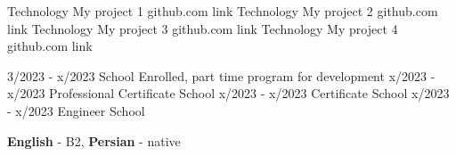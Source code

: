 \documentclass[9pt]{developercv} %
\begin{document}
    \begin{entrylist}
        \entry
        {Technology}
        {My project 1}
        {github.com link}
        {%
            \lipsum[1][1-3]}
        \entry
        {Technology}
        {My project 2}
        {github.com link}
        {%
            \lipsum[1][1-3]}
        \entry
        {Technology}
        {My project 3}
        {github.com link}
        {%
            \lipsum[1][1-3]}
        \entry
        {Technology}
        {My project 4}
        {github.com link}
        {%
            \lipsum[1][1-3]}
    \end{entrylist}

    \vspace{-10 pt}
    \begin{entrylist}
        \entry
        {3/2023 - x/2023}
        {\lipsum[1][1] }
        {School}
        {Enrolled, part time program for development}
        \entry
        {x/2023 - x/2023}
        {Professional Certificate}
        {School}
        {\lipsum[1][1]}
        \entry
        {x/2023 - x/2023}
        {Certificate}
        {School}
        {\lipsum[1][2]}
        \entry
        {x/2023 - x/2023}
        {Engineer}
        {School}
        {\lipsum[1][2]}
    \end{entrylist}

    \vspace{-10 pt}
    \vspace{-6pt}

    \hspace{26mm} \textbf{English} - B2, \textbf{Persian} - native

\end{document}
